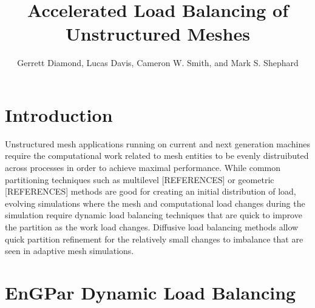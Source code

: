 \documentclass[graybox]{svmult}
\begin{document}
\title*{Accelerated Load Balancing of Unstructured Meshes}
\author{
Gerrett Diamond,
Lucas Davis,
Cameron W. Smith,
and Mark S. Shephard
}

\maketitle


\section{Introduction} \label{sec:intro}


Unstructured mesh applications running on current and next generation machines require the
computational work related to mesh entities to be evenly distruibuted across processes in
order to achieve maximal performance. While common partitioning techniques such as multilevel
[REFERENCES] or geometric [REFERENCES] methods are good for creating an initial distribution
of load, evolving simulations where the mesh and computational load changes during the
simulation require dynamic load balancing techniques that are quick to improve the partition
as the work load changes. Diffusive load balancing methods allow quick partition refinement
for the relatively small changes to imbalance that are seen in adaptive mesh simulations.

\section{EnGPar Dynamic Load Balancing} \label{sec:engpar}
\end{document}
